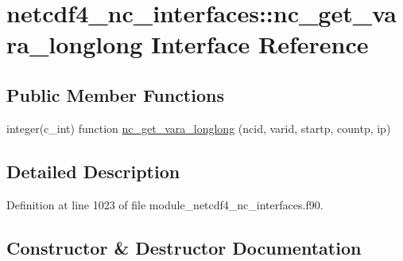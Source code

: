 \hypertarget{interfacenetcdf4__nc__interfaces_1_1nc__get__vara__longlong}{}\section{netcdf4\+\_\+nc\+\_\+interfaces\+:\+:nc\+\_\+get\+\_\+vara\+\_\+longlong Interface Reference}
\label{interfacenetcdf4__nc__interfaces_1_1nc__get__vara__longlong}
\subsection*{Public Member Functions}
\begin{DoxyCompactItemize}
\item 
integer(c\+\_\+int) function \hyperlink{interfacenetcdf4__nc__interfaces_1_1nc__get__vara__longlong_aa722566e0113c9aef4cd7505307c8ddd}{nc\+\_\+get\+\_\+vara\+\_\+longlong} (ncid, varid, startp, countp, ip)
\end{DoxyCompactItemize}


\subsection{Detailed Description}


Definition at line 1023 of file module\+\_\+netcdf4\+\_\+nc\+\_\+interfaces.\+f90.



\subsection{Constructor \& Destructor Documentation}
\mbox{\label{interfacenetcdf4__nc__interfaces_1_1nc__get__vara__longlong_aa722566e0113c9aef4cd7505307c8ddd}} 
